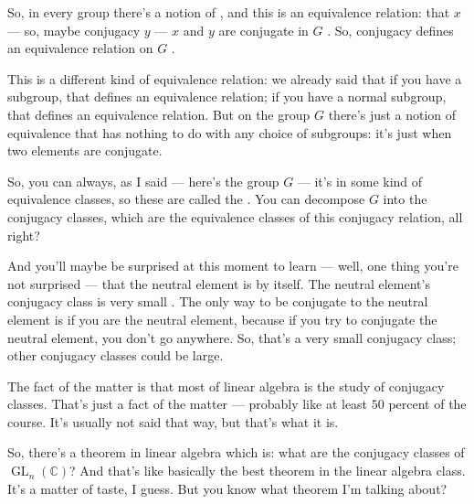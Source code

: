 \begin{hidden}
\end{hidden}

\begin{speech}[01:15:12 - 01:17:21]
So, in every group there's a notion of , and this is an equivalence relation: that $x$ --- so, maybe conjugacy $y$ --- $x$ and $y$ are conjugate in $G$ . So, conjugacy defines an equivalence relation on $G$ .

This is a different kind of equivalence relation: we already said that if you have a subgroup, that defines an equivalence relation; if you have a normal subgroup, that defines an equivalence relation. But on the group $G$ there's just a notion of equivalence that has nothing to do with any choice of subgroups: it's just when two elements are conjugate.

So, you can always, as I said --- here's the group $G$ --- it's in some kind of equivalence classes, so these are called the  . You can decompose $G$ into the conjugacy classes, which are the equivalence classes of this conjugacy relation, all right?

And you'll maybe be surprised at this moment to learn --- well, one thing you're not surprised --- that the neutral element is by itself. The neutral element's conjugacy class is very small . The only way to be conjugate to the neutral element is if you are the neutral element, because if you try to conjugate the neutral element, you don't go anywhere. So, that's a very small conjugacy class; other conjugacy classes could be large.

The fact of the matter is that most of linear algebra is the study of conjugacy classes. That's just a fact of the matter --- probably like at least $50$ percent of the course. It's usually not said that way, but that's what it is.

So, there's a theorem in linear algebra which is: what are the conjugacy classes of $\operatorname{GL}_n(\mathbb{C})$? And that's like basically the best theorem in the linear algebra class. It's a matter of taste, I guess. But you know what theorem I'm talking about?
\end{speech}

